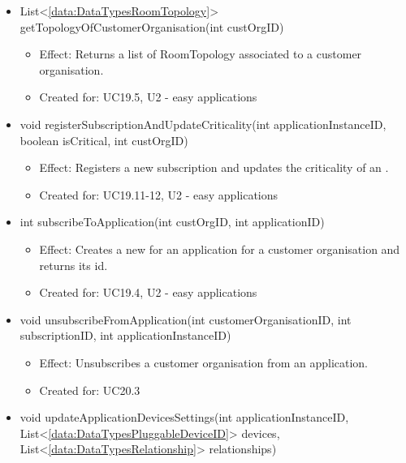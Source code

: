 \begin{description}
\begin{itemize}[noitemsep,nolistsep,leftmargin=-.25cm]
      \item \textsf{List\textless{}\ref{data:DataTypesRoomTopology}\textgreater{} getTopologyOfCustomerOrganisation(int custOrgID)}
        \begin{itemize}[noitemsep,nolistsep]
           \item Effect: Returns a list of RoomTopology associated to a customer organisation.
\item Created for: UC19.5, U2 - easy applications
        \end{itemize}
      \item \textsf{void registerSubscriptionAndUpdateCriticality(int applicationInstanceID, boolean isCritical, int custOrgID)}
        \begin{itemize}[noitemsep,nolistsep]
           \item Effect: Registers a new subscription and updates the criticality of an .
\item Created for: UC19.11-12, U2 - easy applications
        \end{itemize}
      \item \textsf{int subscribeToApplication(int custOrgID, int applicationID)}
        \begin{itemize}[noitemsep,nolistsep]
           \item Effect: Creates a new  for an application for a customer organisation and returns its id.
\item Created for: UC19.4, U2 - easy applications
        \end{itemize}
      \item \textsf{void unsubscribeFromApplication(int customerOrganisationID, int subscriptionID, int applicationInstanceID)}
        \begin{itemize}[noitemsep,nolistsep]
           \item Effect: Unsubscribes a customer organisation from an application.
\item Created for: UC20.3
        \end{itemize}
      \item \textsf{void updateApplicationDevicesSettings(int applicationInstanceID, List\textless{}\ref{data:DataTypesPluggableDeviceID}\textgreater{} devices, List\textless{}\ref{data:DataTypesRelationship}\textgreater{} relationships)}
        \begin{itemize}

\end{itemize}
\end{itemize}
\end{description}
